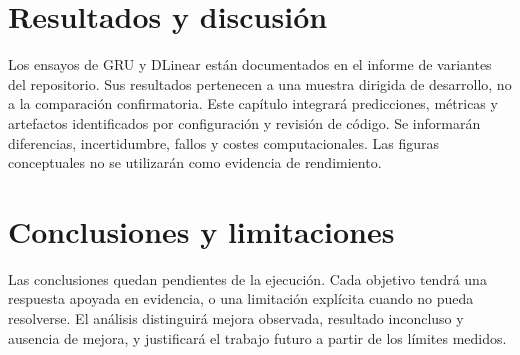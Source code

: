 \documentclass[11pt,a4paper]{report}
\begin{document}
\chapter{Resultados y discusión}
Los ensayos de GRU y DLinear están documentados en el informe de variantes del
repositorio. Sus resultados pertenecen a una muestra dirigida de desarrollo,
no a la comparación confirmatoria. Este capítulo integrará predicciones,
métricas y artefactos identificados por configuración y revisión de código.
Se informarán diferencias, incertidumbre, fallos y costes computacionales.
Las figuras conceptuales no se utilizarán como evidencia de rendimiento.

\chapter{Conclusiones y limitaciones}
Las conclusiones quedan pendientes de la ejecución. Cada objetivo tendrá una
respuesta apoyada en evidencia, o una limitación explícita cuando no pueda
resolverse. El análisis distinguirá mejora observada, resultado inconcluso y
ausencia de mejora, y justificará el trabajo futuro a partir de los límites medidos.

\printbibliography
\end{document}
